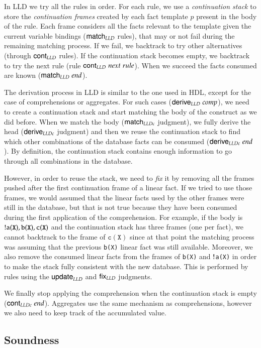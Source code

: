 In LLD we try all the rules in order. For each rule, we use a \emph{continuation stack} to store the \emph{continuation frames} created by
each fact template $p$ present
in the body of the rule. Each frame considers all the facts relevant to the template given the current variable bindings ($\mathsf{match}_{LLD} \;$rules), that
may or not fail during the remaining matching process. If we fail, we backtrack to try other alternatives (through $\mathsf{cont}_{LLD} \;$rules). If the
continuation stack becomes empty, we backtrack to try the next rule (rule $\mathsf{cont}_{LLD} \; next \; rule$). When we succeed the facts consumed are known
($\mathsf{match}_{LLD} \; end$).

The derivation process in LLD is similar to the one used in HDL, except for the case of comprehensions or aggregates. For such cases
($\mathsf{derive}_{LLD} \; comp$), we need to create a continuation stack and start matching the body of the construct as we did before.
When we match the body ($\mathsf{match}_{LLDc} \;$judgment), we fully derive the head ($\mathsf{derive}_{LLDc} \;$judgment) and then we reuse the continuation stack to find which
other combinations of the database facts can be consumed ($\mathsf{derive}_{LLDc} \; end$). By definition, the continuation stack contains
enough information to go through all combinations in the database.

However, in order to reuse the stack, we need to \emph{fix} it by removing all the frames pushed after the first continuation frame
of a linear fact. If we tried to use those frames, we would assumed that the linear facts used by the other frames were still in the database, but that
is not true because they have been consumed during the first application of the comprehension.
For example, if the body is ${!}\mathtt{a(X), b(X), c(X)}$ and the continuation stack has three frames (one per fact), we cannot backtrack to the frame of $\mathtt{c(X)}$
since at that point the matching process was assuming that the previous \texttt{b(X)} linear fact was still available.
Moreover, we also remove the consumed linear facts
from the frames of \texttt{b(X)} and ${!}$\texttt{a(X)} in order to make the stack fully consistent with the new database.
This is performed by rules using the $\mathsf{update}_{LLD} \;$and $\mathsf{fix}_{LLD} \;$judgments.

We finally stop applying the comprehension when the continuation stack is empty ($\mathsf{cont}_{LLDc} \; end$). 
Aggregates use the same mechanism as comprehensions, however we also need to keep track of the accumulated value.

\subsection{Soundness}

